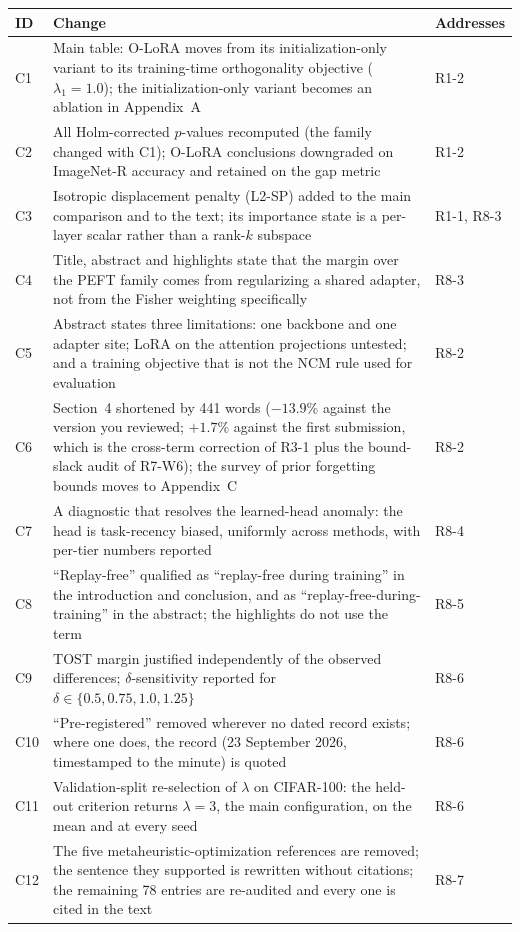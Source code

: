 \begin{center}\small
\begin{longtable}{@{}>{\raggedright\arraybackslash}p{0.85cm}>{\raggedright\arraybackslash}p{9.0cm}>{\raggedright\arraybackslash}p{3.4cm}@{}}
\toprule
ID & Change & Addresses \\
\midrule
C1 & Main table: O-LoRA moves from its initialization-only variant to its training-time
orthogonality objective ($\lambda_1{=}1.0$); the initialization-only variant becomes an
ablation in Appendix~A & R1-2 \\
\addlinespace
C2 & All Holm-corrected $p$-values recomputed (the family changed with C1); O-LoRA
conclusions downgraded on ImageNet-R accuracy and retained on the gap metric & R1-2 \\
\addlinespace
C3 & Isotropic displacement penalty (L2-SP) added to the main comparison and to the text;
its importance state is a per-layer scalar rather than a rank-$k$ subspace & R1-1, R8-3 \\
\addlinespace
C4 & Title, abstract and highlights state that the margin over the PEFT family comes from
regularizing a shared adapter, not from the Fisher weighting specifically & R8-3 \\
\addlinespace
C5 & Abstract states three limitations: one backbone and one adapter site; LoRA on the
attention projections untested; and a training objective that is not the NCM rule used for
evaluation & R8-2 \\
\addlinespace
C6 & Section~4 shortened by 441 words ($-13.9\%$ against the version you reviewed; $+1.7\%$
against the first submission, which is the cross-term correction of R3-1 plus the
bound-slack audit of R7-W6); the survey of prior forgetting bounds moves to
Appendix~C & R8-2 \\
\addlinespace
C7 & A diagnostic that resolves the learned-head anomaly: the head is task-recency biased,
uniformly across methods, with per-tier numbers reported & R8-4 \\
\addlinespace
C8 & ``Replay-free'' qualified as ``replay-free during training'' in the introduction and
conclusion, and as ``replay-free-during-training'' in the abstract; the highlights do not
use the term & R8-5 \\
\addlinespace
C9 & TOST margin justified independently of the observed differences; $\delta$-sensitivity
reported for $\delta\in\{0.5,0.75,1.0,1.25\}$ & R8-6 \\
\addlinespace
C10 & ``Pre-registered'' removed wherever no dated record exists; where one does, the
record (23 September 2026, timestamped to the minute) is quoted & R8-6 \\
\addlinespace
C11 & Validation-split re-selection of $\lambda$ on CIFAR-100: the held-out criterion
returns $\lambda{=}3$, the main configuration, on the mean and at every seed & R8-6 \\
\addlinespace
C12 & The five metaheuristic-optimization references are removed; the sentence they
supported is rewritten without citations; the remaining 78 entries are re-audited and every
one is cited in the text & R8-7 \\
\bottomrule
\end{longtable}
\end{center}
